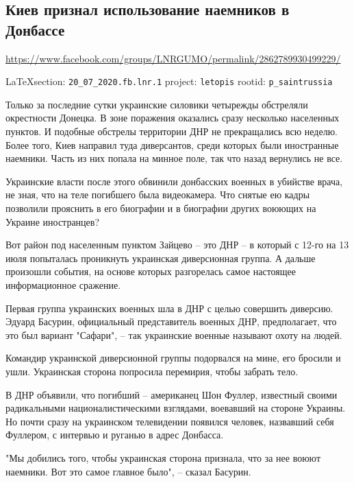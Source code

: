  
 
\subsection{Киев признал использование наемников в Донбассе}
\url{https://www.facebook.com/groups/LNRGUMO/permalink/2862789930499229/}
  
\vspace{0.5cm}
{\small\LaTeX section: \verb|20_07_2020.fb.lnr.1| project: \verb|letopis| rootid: \verb|p_saintrussia|}
\vspace{0.5cm}

Только за последние сутки украинские силовики четырежды обстреляли окрестности
Донецка. В зоне поражения оказались сразу несколько населенных пунктов. И
подобные обстрелы территории ДНР не прекращались всю неделю. Более того, Киев
направил туда диверсантов, среди которых были иностранные наемники. Часть из
них попала на минное поле, так что назад вернулись не все. 

Украинские власти после этого обвинили донбасских военных в убийстве врача, не
зная, что на теле погибшего была видеокамера. Что снятые ею кадры позволили
прояснить в его биографии и в биографии других воюющих на Украине иностранцев?

Вот район под населенным пунктом Зайцево – это ДНР – в который с 12-го на 13
июля попыталась проникнуть украинская диверсионная группа. А дальше произошли
события, на основе которых разгорелась самое настоящее информационное сражение.

Первая группа украинских военных шла в ДНР с целью совершить диверсию. Эдуард
Басурин, официальный представитель военных ДНР, предполагает, что это был
вариант "Сафари", – так украинские военные называют охоту на людей.

Командир украинской диверсионной группы подорвался на мине, его бросили и ушли.
Украинская сторона попросила перемирия, чтобы забрать тело.

В ДНР объявили, что погибший – американец Шон Фуллер, известный своими
радикальными националистическими взглядами, воевавший на стороне Украины. Но
почти сразу на украинском телевидении появился человек, назвавший себя
Фуллером, с интервью и руганью в адрес Донбасса.

"Мы добились того, чтобы украинская сторона признала, что за нее воюют
наемники. Вот это самое главное было", – сказал Басурин.

